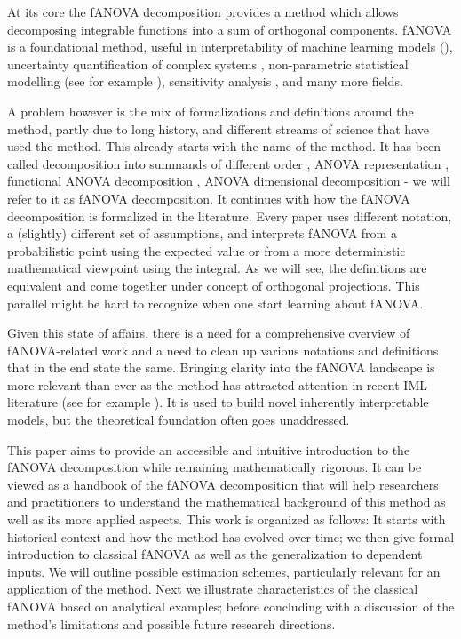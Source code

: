 At its core the fANOVA decomposition provides a method which allows decomposing integrable functions into a sum of orthogonal components.
fANOVA is a foundational method, useful in interpretability of machine learning models (\cite{hooker2004, molnar2025}), uncertainty quantification of complex systems \cite{rahman2014}, non-parametric statistical modelling (see for example \cite{stone1997}), sensitivity analysis \cite{sobol1993sensitivity}, and many more fields.\par


A problem however is the mix of formalizations and definitions around the method, partly due to long history, and different streams of science that have used the method.
This already starts with the name of the method. It has been called decomposition into summands of different order \citep{sobol1993sensitivity}, ANOVA representation \citep{sobol1993sensitivity}, functional ANOVA decomposition \citep{hooker2004}, ANOVA dimensional decomposition \citep{rahman2014} - we will refer to it as fANOVA decomposition.
It continues with how the fANOVA decomposition is formalized in the literature. Every paper uses different notation, a (slightly) different set of assumptions, and interprets fANOVA from a probabilistic point using the expected value or from a more deterministic mathematical viewpoint using the integral.
As we will see, the definitions are equivalent and come together under concept of orthogonal projections. This parallel might be hard to recognize when one start learning about fANOVA.\par

Given this state of affairs, there is a need for a comprehensive overview of fANOVA-related work and a need to clean up various notations and definitions that in the end state the same.
Bringing clarity into the fANOVA landscape is more relevant than ever as the method has attracted attention in recent IML literature (see for example \cite{hu2025}).
It is used to build novel inherently interpretable models, but the theoretical foundation often goes unaddressed.\par

This paper aims to provide an accessible and intuitive introduction to the fANOVA decomposition while remaining mathematically rigorous.
It can be viewed as a handbook of the fANOVA decomposition that will help researchers and practitioners
to understand the mathematical background of this method as well as its more applied aspects.
This work is organized as follows: It starts with historical context and how the method has evolved over time; we then give formal introduction to classical fANOVA as well as the generalization to dependent inputs. We will outline possible estimation schemes, particularly relevant for an application of the method. Next we illustrate characteristics of the classical fANOVA based on analytical examples; before concluding with a discussion of the method's limitations and possible future research directions.
